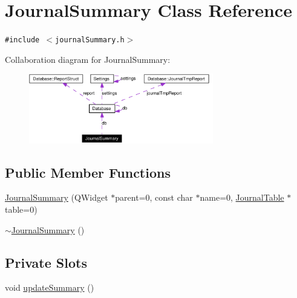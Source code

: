 \hypertarget{classJournalSummary}{
\section{Journal\-Summary Class Reference}
\label{classJournalSummary}
}
{\tt \#include $<$journal\-Summary.h$>$}

Collaboration diagram for Journal\-Summary:\begin{figure}[H]
\begin{center}
\leavevmode
\includegraphics[width=228pt]{classJournalSummary__coll__graph}
\end{center}
\end{figure}
\subsection*{Public Member Functions}
\begin{CompactItemize}
\item 
\hyperlink{classJournalSummary_a0}{Journal\-Summary} (QWidget $\ast$parent=0, const char $\ast$name=0, \hyperlink{classJournalTable}{Journal\-Table} $\ast$table=0)
\item 
\hyperlink{classJournalSummary_a1}{$\sim$Journal\-Summary} ()
\end{CompactItemize}
\subsection*{Private Slots}
\begin{CompactItemize}
\item 
void \hyperlink{classJournalSummary_k0}{update\-Summary} ()
\end{CompactItemize}
